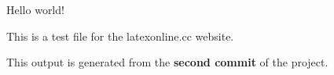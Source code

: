 \documentclass{article}
\begin{document}
Hello world!

This is a test file for the latexonline.cc website.

This output is generated from the \textbf{second commit} of the project.
\end{document}

